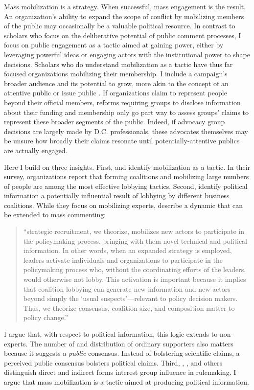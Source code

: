 Mass mobilization is a strategy. When successful, mass engagement is the result. An organization's ability to expand the scope of conflict by mobilizing members of the public may occasionally be a valuable political resource. 
In contrast to scholars who focus on the deliberative potential of public comment processes, I focus on public engagement as a tactic aimed at gaining power, either by leveraging powerful ideas or engaging actors with the institutional power to shape decisions.
Scholars who do understand mobilization as a tactic \citep{Furlong1997, Kerwin2011} have thus far focused organizations mobilizing their membership. %
I include a campaign's broader audience and its potential to grow, more akin to the concept of an attentive public \citep{Key1961} or issue public \citep{Converse1964}. If organizations claim to represent people beyond their official members, 
reforms requiring groups to disclose information about their funding and membership \citep{Seifter2016UCLA} only go part way to assess groups' claims to represent these broader segments of the public. Indeed, if advocacy group decisions are largely made by D.C. professionals, these advocates themselves may be unsure how broadly their claims resonate until potentially-attentive publics are actually engaged.

Here I build on three insights. First, \citet{Kerwin2011} and \citet{Furlong1997} identify mobilization as a tactic. In their survey, organizations report that forming coalitions and mobilizing large numbers of people are among the most effective lobbying tactics. Second, \citet{Nelson2012} identify political information a potentially influential result of lobbying by different business coalitions. While they focus on mobilizing experts, \citet{Nelson2012} describe a dynamic that can be extended to mass commenting: 
\begin{quote}
``strategic recruitment, we theorize, mobilizes new actors to participate in the policymaking process, bringing with them novel technical and political information. In other words, when an expanded strategy is employed, leaders activate individuals and organizations to participate in the policymaking process who, without the coordinating efforts of the leaders, would otherwise not lobby. This activation is important because it implies that coalition lobbying can generate new information and new actors---beyond simply the `usual suspects'---relevant to policy decision makers. Thus, we theorize consensus, coalition size, and composition matter to policy change.'' 
\end{quote}
I argue that, with respect to political information, this logic extends to non-experts. The number of and distribution of ordinary supporters also matters because it suggests a \textit{public} consensus. Instead of bolstering scientific claims, a perceived public consensus bolsters political claims. 
Third, \citet{Furlong1998}, \citet{Yackee2006JPART}, and others distinguish direct and indirect forms interest group influence in rulemaking. I argue that mass mobilization is a tactic aimed at producing political information.%


